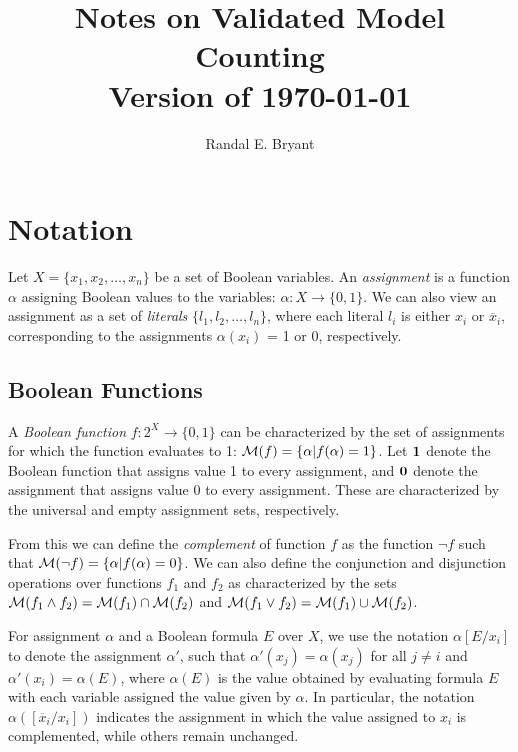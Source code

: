 \documentclass{llncs}
\title{Notes on Validated Model Counting \\ Version of \today}
\author{Randal E. Bryant}
\institute{
Computer Science Department \\
Carnegie Mellon University, Pittsburgh, PA, United States
}
\newcommand{\one}{\mbox{\bf 1}}
\newcommand{\zero}{\mbox{\bf 0}}
\newcommand{\booland}{\land}
\newcommand{\boolor}{\lor}
\newcommand{\boolnot}{\neg}
\newcommand{\tautology}{1}
\newcommand{\nil}{0}
\newcommand{\obar}[1]{\overline{#1}}
\newcommand{\interp}{\alpha}
\newcommand{\interpset}[1]{{\cal M}(#1)}
\newcommand{\subs}[2]{[#2/#1]}
\begin{document}
\maketitle

\section{Notation}

Let $X = \{x_1, x_2, \ldots, x_n\}$ be a set of Boolean variables.  An
{\em assignment} is a function $\interp$ assigning Boolean values to
the variables: $\interp:X \rightarrow \{\nil, \tautology\}$.  We can
also view an assignment as a set of {\em literals} $\{l_1, l_2,
\ldots, l_n\}$, where each literal $l_i$ is either $x_i$ or
$\obar{x}_i$, corresponding to the assignments $\interp(x_i)$ = 1 or 0,
respectively.

\subsection{Boolean Functions}

A {\em Boolean function} $f:2^X \rightarrow \{0,1\}$ can be
characterized by the set of assignments for which the function
evaluates to 1: $\interpset{f} = \{ \interp | f(\interp) = 1\}$.  Let
$\one$ denote the Boolean function that assigns value 1 to every
assignment, and $\zero$ denote the assignment that assigns value 0 to
every assignment.  These are characterized by the universal and empty
assignment sets, respectively.


From
this we can define the {\em complement} of function $f$ as the function
$\boolnot f$ such that
$\interpset{\boolnot f} = \{ \interp | f(\interp) = 0\}$.
We can also define the conjunction and disjunction operations over functions $f_1$ and $f_2$ as characterized by the sets
$\interpset{f_1 \booland f_2} = \interpset{f_1} \cap \interpset{f_2}$ and
$\interpset{f_1 \boolor f_2} = \interpset{f_1} \cup \interpset{f_2}$.

For assignment $\interp$ and a Boolean formula $E$ over $X$, we
use the notation $\interp\subs{x_i}{E}$ to denote the assignment
$\interp'$, such that $\interp'(x_j) = \interp(x_j)$ for all $j \not = i$
and $\interp'(x_i) = \interp(E)$, where $\interp(E)$ is the value obtained by evaluating formula $E$ with each variable assigned the value given by $\interp$.
In particular, the notation
$\interp(\subs{x_i}{\obar{x}_i})$
indicates the assignment in which the value
assigned to $x_i$ is complemented, while others remain unchanged.
\end{document}
